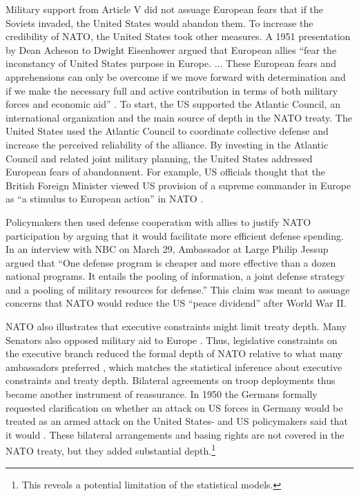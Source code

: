 \documentclass[12pt]{article}
\begin{document}
Military support from Article V did not assuage European fears that if the Soviets invaded, the United States would abandon them.
To increase the credibility of NATO, the United States took other measures.  
A 1951 presentation by Dean Acheson to Dwight Eisenhower argued that European allies ``fear the inconstancy of United States purpose in Europe. ... These European fears and apprehensions can only be overcome if we move forward with determination and if we make the necessary full and active contribution in terms of both military forces and economic aid'' \citep[pg. 3]{Acheson1951}. 
To start, the US supported the Atlantic Council, an international organization and the main source of depth in the NATO treaty. 
The United States used the Atlantic Council to coordinate collective defense and increase the perceived reliability of the alliance. 
By investing in the Atlantic Council and related joint military planning, the United States addressed European fears of abandonment. 
For example, US officials thought that the British Foreign Minister viewed US provision of a supreme commander in Europe as ``a stimulus to European action'' in NATO \citep{Acheson1950}. 


Policymakers then used defense cooperation with allies to justify NATO participation by arguing that it would facilitate more efficient defense spending. 
In an interview with NBC on March 29, Ambassador at Large Philip Jessup argued that ``One defense program is cheaper and more effective than a dozen national programs. It entails the pooling of information, a joint defense strategy and a pooling of military resources for defense.''
This claim was meant to assuage concerns that NATO would reduce the US ``peace dividend'' after World War II. 


NATO also illustrates that executive constraints might limit treaty depth. 
Many Senators also opposed military aid to Europe \citep[pg 285]{Acheson1969}. 
Thus, legislative constraints on the executive branch reduced the formal depth of NATO relative to what many ambassadors preferred \citep[pg 277]{Acheson1969}, which matches the statistical inference about executive constraints and treaty depth.  
Bilateral agreements on troop deployments thus became another instrument of reassurance. 
In 1950 the Germans formally requested clarification on whether an attack on US forces in Germany would be treated as an armed attack on the United States- and US policymakers said that it would \citep[pg. 395]{Acheson1969}.  
These bilateral arrangements and basing rights are not covered in the NATO treaty, but they added substantial depth.\footnote{This reveals a potential limitation of the statistical models.}  
\end{document}
